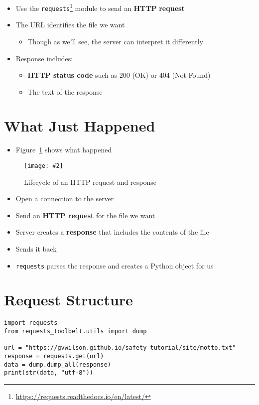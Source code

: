 \documentclass[krantzl]{krantz}
\newcommand{\figpdf}[4]{\begin{figure}%
\centering%
\texttt{[image: \#2]}%
\caption{#3}%
\label{#1}%
\end{figure}}
\newcommand{\figref}[1]{Figure~\ref{#1}}
\newcommand{\glossref}[1]{\textbf{#1}}
\newcommand{\hreffoot}[2]{{#1}\footnote{\href{#2}{#2}}}
\begin{document}
\begin{itemize}
\item Use the \hreffoot{\texttt{requests}}{https://requests.readthedocs.io/en/latest/} module to send an \glossref{HTTP} \glossref{request}

\item The URL identifies the file we want\begin{itemize}
\item Though as we’ll see, the server can interpret it differently

\end{itemize}


\item Response includes:\begin{itemize}
\item \glossref{HTTP status code} such as 200 (OK) or 404 (Not Found)

\item The text of the response

\end{itemize}


\end{itemize}
\section{What Just Happened}
\begin{itemize}
\item \figref{http_lifecycle} shows what happened

\end{itemize}
\figpdf{http_lifecycle}{http/./http_lifecycle.pdf}{Lifecycle of an HTTP request and response}{0.8}
\begin{itemize}
\item Open a connection to the server

\item Send an \glossref{HTTP request} for the file we want

\item Server creates a \glossref{response} that includes the contents of the file

\item Sends it back

\item \texttt{requests} parses the response and creates a Python object for us

\end{itemize}
\section{Request Structure}
\begin{lstlisting}[frame=tblr]
import requests
from requests_toolbelt.utils import dump

url = "https://gvwilson.github.io/safety-tutorial/site/motto.txt"
response = requests.get(url)
data = dump.dump_all(response)
print(str(data, "utf-8"))
\end{lstlisting}
\end{document}
